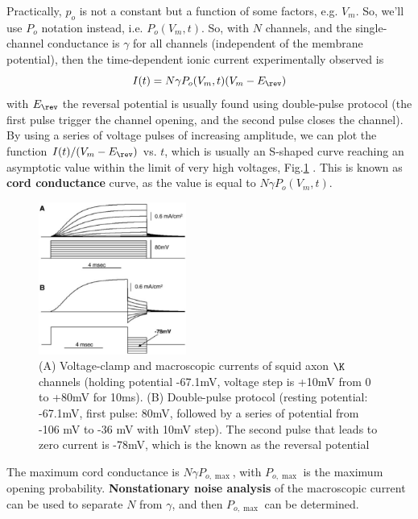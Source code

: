 Practically, $p_o$ is not a constant but a function of some factors, e.g. $V_m$.
So, we'll use $P_o$ notation instead, i.e. $P_o(V_m,t)$.
So, with $N$ channels, and the single-channel conductance is $\gamma$ for all
channels (independent of the membrane potential), then the time-dependent ionic
current experimentally observed is
\begin{equation}
I(t) = N\gamma P_o(V_m,t)(V_m-E_\rev)
\end{equation}
with $E_\rev$ the reversal potential is usually found using double-pulse
protocol (the first pulse trigger the channel opening, and the second pulse
closes the channel). By using a series of voltage pulses of increasing
amplitude, we can plot the function $I(t)/(V_m-E_\rev)$ vs. $t$, which is
usually an S-shaped curve reaching an asymptotic value within the limit of very
high voltages, Fig.\ref{fig:double_pulse_protocol} \citep{alvarez2002}. This is
known as {\bf cord conductance} curve, as the value is equal to $N\gamma
P_o(V_m,t)$.

\begin{figure}[!hbt]
 \centerline{\includegraphics[height=5cm,angle=0]{./images/double_pulse_protocol.eps}}
 \caption{(A) Voltage-clamp and macroscopic currents of squid axon $\K$
 channels (holding potential -67.1mV, voltage step is +10mV from 0 to +80mV for
 10ms). (B) Double-pulse protocol (resting potential: -67.1mV, first pulse:
 80mV, followed by a series of  potential from -106 mV to -36 mV with 10mV
 step). The second pulse that leads to zero current is -78mV, which is the
 known as the reversal potential}
\label{fig:double_pulse_protocol}
\end{figure}

The maximum cord conductance is $N\gamma P_{o,\max}$, with $P_{o,\max}$ is the
maximum opening probability. {\bf Nonstationary noise analysis} of the
macroscopic current can be used to separate $N$ from $\gamma$, and then
$P_{o,\max}$ can be determined.


